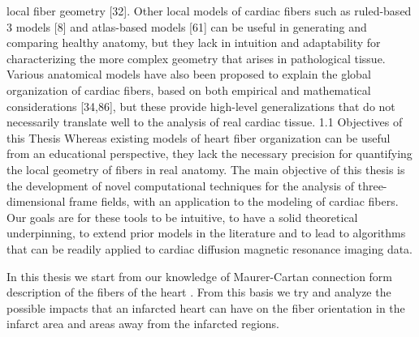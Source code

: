 local fiber geometry [32]. Other local models of cardiac fibers such as ruled-based
3
models [8] and atlas-based models [61] can be useful in generating and comparing
healthy anatomy, but they lack in intuition and adaptability for characterizing the
more complex geometry that arises in pathological tissue. Various anatomical models
have also been proposed to explain the global organization of cardiac fibers, based on
both empirical and mathematical considerations [34,86], but these provide high-level
generalizations that do not necessarily translate well to the analysis of real cardiac
tissue.
1.1 Objectives of this Thesis
Whereas existing models of heart fiber organization can be useful from an educational
perspective, they lack the necessary precision for quantifying the local
geometry of fibers in real anatomy. The main objective of this thesis is the development
of novel computational techniques for the analysis of three-dimensional frame
fields, with an application to the modeling of cardiac fibers. Our goals are for these
tools to be intuitive, to have a solid theoretical underpinning, to extend prior models
in the literature and to lead to algorithms that can be readily applied to cardiac
diffusion magnetic resonance imaging data.

In this thesis we start from our knowledge of Maurer-Cartan connection form description of the fibers of the heart \cite{7053934}. From this basis we try and analyze the possible impacts that an infarcted heart can have on the fiber orientation in the infarct area and areas away from the infarcted regions.

\chapter{}
